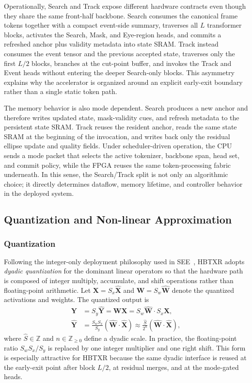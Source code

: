 \documentclass[journal]{IEEEtran}
\begin{document}
Operationally, Search and Track expose different hardware contracts even though they share the same front-half backbone. Search consumes the canonical frame tokens together with a compact event-side summary, traverses all $L$ transformer blocks, activates the Search, Mask, and Eye-region heads, and commits a refreshed anchor plus validity metadata into state SRAM. Track instead consumes the event tensor and the previous accepted state, traverses only the first $L/2$ blocks, branches at the cut-point buffer, and invokes the Track and Event heads without entering the deeper Search-only blocks. This asymmetry explains why the accelerator is organized around an explicit early-exit boundary rather than a single static token path.

The memory behavior is also mode dependent. Search produces a new anchor and therefore writes updated state, mask-validity cues, and refresh metadata to the persistent state SRAM. Track reuses the resident anchor, reads the same state SRAM at the beginning of the invocation, and writes back only the residual ellipse update and quality fields. Under scheduler-driven operation, the CPU sends a mode packet that selects the active tokenizer, backbone span, head set, and commit policy, while the FPGA reuses the same token-processing fabric underneath. In this sense, the Search/Track split is not only an algorithmic choice; it directly determines dataflow, memory lifetime, and controller behavior in the deployed system.

\subsection{Quantization and Non-linear Approximation}

\subsubsection{Quantization}
Following the integer-only deployment philosophy used in SEE~\cite{ref9}, HBTXR adopts \emph{dyadic quantization} for the dominant linear operators so that the hardware path is composed of integer multiply, accumulate, and shift operations rather than floating-point arithmetic. Let $\mathbf X=S_x\hat{\mathbf X}$ and $\mathbf W=S_w\hat{\mathbf W}$ denote the quantized activations and weights. The quantized output is
\begin{align}
\mathbf Y &= S_y\hat{\mathbf Y} = \mathbf W\mathbf X
          = S_w\hat{\mathbf W}\cdot S_x\hat{\mathbf X},\\
\hat{\mathbf Y}
&= \frac{S_wS_x}{S_y}\left(\hat{\mathbf W}\cdot\hat{\mathbf X}\right)
 \approx \frac{\hat S}{2^n}
 \left(\hat{\mathbf W}\cdot\hat{\mathbf X}\right),
\end{align}
where $\hat S \in \mathbb Z$ and $n\in \mathbb Z_{\ge 0}$ define a dyadic scale. In practice, the floating-point ratio $S_wS_x/S_y$ is replaced by one integer multiplier and one right shift. This form is especially attractive for HBTXR because the same dyadic interface is reused at the early-exit point after block $L/2$, at residual merges, and at the mode-gated heads.
\end{document}
